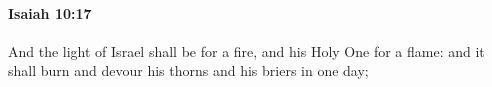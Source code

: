
		\paragraph{Isaiah 10:17} %
			\label{ISAIAH-10-17}

			And the light of Israel shall be for a fire, and his Holy One for a flame: and it shall burn and devour his thorns and his briers in one day;


